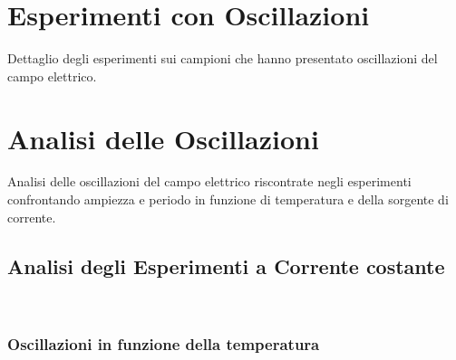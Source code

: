 \documentclass[11pt]{article}
\begin{document}
    \hypertarget{esperimenti-con-oscillazioni}{%
\section{Esperimenti con
Oscillazioni}\label{esperimenti-con-oscillazioni}}

    Dettaglio degli esperimenti sui campioni che hanno presentato
oscillazioni del campo elettrico.


    
    
    \hypertarget{analisi-delle-oscillazioni}{%
\section{Analisi delle Oscillazioni}\label{analisi-delle-oscillazioni}}

    Analisi delle oscillazioni del campo elettrico riscontrate negli
esperimenti confrontando ampiezza e periodo in funzione di temperatura e
della sorgente di corrente.

    \hypertarget{analisi-degli-esperimenti-a-corrente-costante}{%
\subsection{Analisi degli Esperimenti a Corrente
costante}\label{analisi-degli-esperimenti-a-corrente-costante}}



    \begin{center}
    \end{center}
    { \hspace*{\fill} \\}
    
    \hypertarget{oscillazioni-in-funzione-della-temperatura}{%
\subsubsection{Oscillazioni in funzione della
temperatura}\label{oscillazioni-in-funzione-della-temperatura}}

    \begin{center}
    \end{center}
    { \hspace*{\fill} \\}
    
    \begin{center}
    \end{center}
    { \hspace*{\fill} \\}
    
\end{document}
